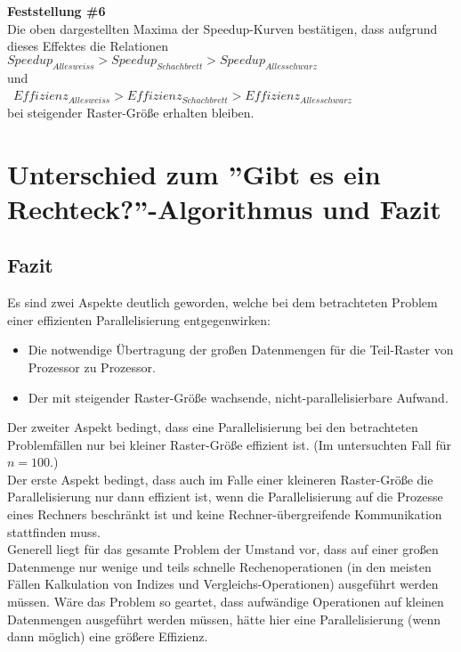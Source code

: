 \documentclass[
10pt, %
a4paper, %
oneside, %
headinclude,footinclude, %
BCOR5mm, %
]{scrartcl}
\begin{document}
\textbf{Feststellung \#6}\\
Die oben dargestellten Maxima der Speedup-Kurven bestätigen, dass aufgrund dieses Effektes die Relationen\\ 
\(Speedup_{Alles weiss} > Speedup_{Schachbrett} > Speedup_{Alles schwarz} \)\\
und\\\
\(Effizienz_{Alles weiss} > Effizienz_{Schachbrett} > Effizienz_{Alles schwarz} \)\\
bei steigender Raster-Größe erhalten bleiben.

\section{Unterschied zum ''Gibt es ein Rechteck?''-Algorithmus und Fazit}

\subsection{Fazit}
Es sind zwei Aspekte deutlich geworden, welche bei dem betrachteten Problem einer effizienten Parallelisierung entgegenwirken:
\begin{itemize}[noitemsep] %
	\item Die notwendige Übertragung der großen Datenmengen für die Teil-Raster von Prozessor zu Prozessor.
	\item Der mit steigender Raster-Größe wachsende, nicht-parallelisierbare Aufwand.
\end{itemize}

Der zweiter Aspekt bedingt, dass eine Parallelisierung bei den betrachteten Problemfällen nur bei kleiner Raster-Größe effizient ist. (Im untersuchten Fall für \(n=100\).)\\
Der erste Aspekt bedingt, dass auch im Falle einer kleineren Raster-Größe die Parallelisierung nur dann effizient ist, wenn die Parallelisierung auf die Prozesse eines Rechners beschränkt ist und keine Rechner-übergreifende Kommunikation stattfinden muss.\\

Generell liegt für das gesamte Problem der Umstand vor, dass auf einer großen Datenmenge nur wenige und teils schnelle Rechenoperationen (in den meisten Fällen Kalkulation von Indizes und Vergleichs-Operationen) ausgeführt werden müssen. Wäre das Problem so geartet, dass aufwändige Operationen auf kleinen Datenmengen ausgeführt werden müssen, hätte 
hier eine Parallelisierung (wenn dann möglich) eine größere Effizienz.
\end{document}
